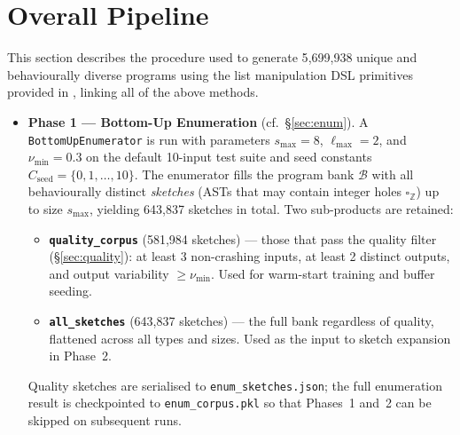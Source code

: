 \documentclass[11pt,a4paper]{article}
\begin{document}
\section{Overall Pipeline}\label{sec:pipeline}

This section describes the procedure used to generate 5{,}699{,}938 unique and behaviourally diverse programs using the list manipulation DSL primitives provided in \citet{rule2024symbolic}, linking all of the above methods.

\begin{itemize}

  \item \textbf{Phase 1 --- Bottom-Up Enumeration}
    (cf.~\S\ref{sec:enum}).
    A \texttt{BottomUpEnumerator} is run with parameters $s_{\max} = 8$,
    $\ell_{\max} = 2$, and $\nu_{\min} = 0.3$ on the default 10-input test suite
    and seed constants $C_{\mathrm{seed}} = \{0, 1, \ldots, 10\}$.
    The enumerator fills the program bank $\mathcal{B}$ with all
    behaviourally distinct \emph{sketches} (ASTs that may contain integer
    holes $\square_{\mathbb{Z}}$) up to size $s_{\max}$, yielding
    643{,}837 sketches in total.
    Two sub-products are retained:
    \begin{itemize}
      \item \textbf{\texttt{quality\_corpus}} (581{,}984 sketches) --- those
            that pass the quality filter (\S\ref{sec:quality}): at least 3
            non-crashing inputs, at least 2 distinct outputs, and output
            variability $\geq \nu_{\min}$.  Used for warm-start training and
            buffer seeding.
      \item \textbf{\texttt{all\_sketches}} (643{,}837 sketches) --- the full
            bank regardless of quality, flattened across all types and sizes.
            Used as the input to sketch expansion in Phase~2.
    \end{itemize}
    Quality sketches are serialised to \texttt{enum\_sketches.json}; the full
    enumeration result is checkpointed to \texttt{enum\_corpus.pkl} so that
    Phases~1 and~2 can be skipped on subsequent runs.


\end{itemize}
\end{document}
